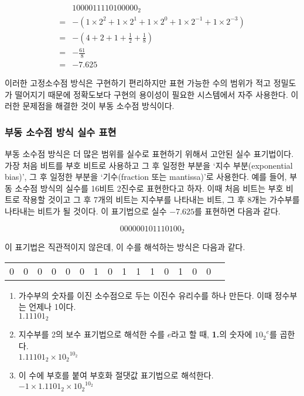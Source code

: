 \documentclass{article}
\begin{document}
$$
\begin{aligned}
    & 1000011110100000_2 \\
    =& -\left(1 \times 2^2 + 1 \times 2^1 + 1 \times 2^0 + 1 \times 2^{-1} + 1 \times 2^{-3}\right) \\
    =& -\left(4 + 2 + 1 + \frac{1}{2} + \frac{1}{8}\right) \\
    =& -\frac{61}{8} \\
    =& -7.625
\end{aligned}
$$

이러한 고정소수점 방식은 구현하기 편리하지만 표현 가능한 수의 범위가 적고 정밀도가 떨어지기
때문에 정확도보다 구현의 용이성이 필요한 시스템에서 자주 사용한다.
이러한 문제점을 해결한 것이 부동 소수점 방식이다.

\subsubsection{부동 소수점 방식 실수 표현}

부동 소수점 방식은 더 많은 범위를 실수로 표현하기 위해서 고안된 실수 표기법이다.
가장 처음 비트를 부호 비트로 사용하고 그 후 일정한 부분을 `지수 부분(exponential bias)',
그 후 일정한 부분을 `기수(fraction 또는 mantissa)'로 사용한다.
예를 들어, 부동 소수점 방식의 실수를 16비트 2진수로 표현한다고 하자.
이때 처음 비트는 부호 비트로 작용할 것이고 그 후 7개의 비트는 지수부를 나타내는 비트,
그 후 8개는 가수부를 나타내는 비트가 될 것이다.
이 표기법으로 실수 $-7.625$를 표현하면 다음과 같다.

$$
0 0000010 1110100_2
$$

이 표기법은 직관적이지 않은데, 이 수를 해석하는 방식은 다음과 같다.

\begin{center}
    \begin{tabular}{c|ccccccc|cccccccc}
        0 & 0 & 0 & 0 & 0 & 0 & 1 & 0 & 1 & 1 & 1 & 0 & 1 & 0 & 0
    \end{tabular}
\end{center}

\begin{enumerate}
    \item 가수부의 숫자를 이진 소수점으로 두는 이진수 유리수를 하나 만든다. 이때 정수부는 언제나 1이다. \\
          $1.11101_2$
    \item 지수부를 2의 보수 표기법으로 해석한 수를 $e$라고 할 때, \textbf{1.}의 숫자에 ${10_2}^e$를 곱한다. \\
          $1.11101_2 \times {10_2}^{10_2}$
    \item 이 수에 부호를 붙여 부호화 절댓값 표기법으로 해석한다. \\
          $-1 \times 1.1101_2 \times {10_2}^{10_2}$
\end{enumerate}
\end{document}
